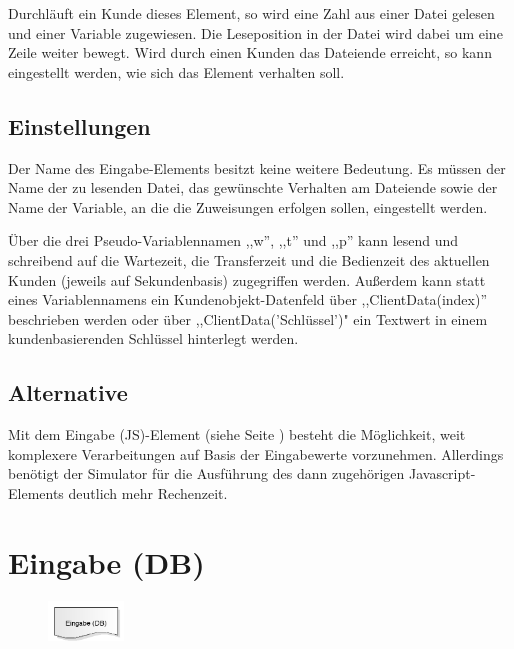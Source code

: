 Durchläuft ein Kunde dieses Element, so wird eine Zahl aus einer Datei gelesen und einer
Variable zugewiesen. Die Leseposition in der Datei wird dabei um eine Zeile weiter bewegt.
Wird durch einen Kunden das Dateiende erreicht, so kann eingestellt werden, wie sich
das Element verhalten soll.

\subsection*{Einstellungen}

Der Name des Eingabe-Elements besitzt keine weitere Bedeutung. Es müssen der Name der zu lesenden
Datei, das gewünschte Verhalten am Dateiende sowie der Name der Variable, an die die Zuweisungen
erfolgen sollen, eingestellt werden.

Über die drei Pseudo-Variablennamen ,,w'', ,,t'' und ,,p'' kann lesend und schreibend auf die Wartezeit, die Transferzeit
und die Bedienzeit des aktuellen Kunden (jeweils auf Sekundenbasis) zugegriffen werden. Außerdem kann statt eines
Variablennamens ein Kundenobjekt-Datenfeld über ,,ClientData(index)'' beschrieben werden oder über ,,ClientData('Schlüssel')"
ein Textwert in einem kundenbasierenden Schlüssel hinterlegt werden.

\subsection*{Alternative}

Mit dem Eingabe (JS)-Element (siehe Seite \pageref{ref:ModelElementInputJS}) besteht die Möglichkeit, weit komplexere
Verarbeitungen auf Basis der Eingabewerte vorzunehmen. Allerdings benötigt der Simulator für die Ausführung
des dann zugehörigen Javascript-Elements deutlich mehr Rechenzeit.


\section{Eingabe (DB)}
\label{ref:ModelElementInputDB}

\begin{figure}
\vspace{-22pt}
\includegraphics[width=2cm]{imageModelElementInputDB.png}
\vspace{-22pt}
\end{figure}

